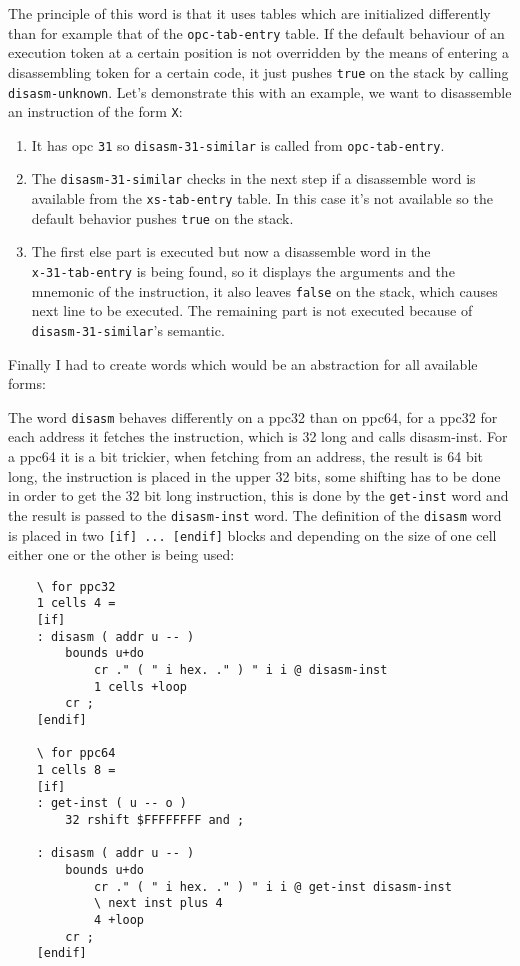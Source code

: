     The principle of this word is that it uses tables which are initialized
    differently than for example that of the \texttt{opc-tab-entry} table. If
    the default behaviour of an execution token at a certain position is not
    overridden by the means of entering a disassembling token for a certain
    code, it just pushes \texttt{true} on the stack by calling 
    \texttt{disasm-unknown}. Let's demonstrate this with an example, we want 
    to disassemble an instruction of the form \texttt{X}:

    \begin{enumerate}
    \item It has opc \texttt{31} so \texttt{disasm-31-similar} is called from
    \texttt{opc-tab-entry}.
    \item The \texttt{disasm-31-similar} checks in the next step if a
    disassemble word is available from the \texttt{xs-tab-entry} table. In 
    this case it's not available so the default behavior pushes 
    \texttt{true} on the stack.
    \item The first else part is executed but now a disassemble word in the 
    \\\texttt{x-31-tab-entry} is being found, so it displays the arguments and 
    the mnemonic of the instruction, it also leaves \texttt{false} on the stack,
    which causes next line to be executed. The remaining part is not executed
    because of \texttt{disasm-31-similar}'s semantic.
    \end{enumerate}

    Finally I had to create words which would be an abstraction for all 
    available forms:

    The word
    \texttt{disasm} behaves differently on a ppc32 than on ppc64, for a ppc32
    for each address it fetches the instruction, which is 32 long and calls
    disasm-inst. For a ppc64 it is a bit trickier, when fetching from an 
    address, the result is 64 bit long, the instruction is placed in the upper 
    32 bits, some shifting has to be done in order to get the 32 bit long
    instruction, this is done by the \texttt{get-inst} word and the result is
    passed to the \texttt{disasm-inst} word.
    The definition of the \texttt{disasm} word is placed in two
    \texttt{[if] ...  [endif]} blocks and depending on the size of one cell
    either one or the other is being used:

    \pagebreak
    \begin{verbatim}
    \ for ppc32
    1 cells 4 =
    [if]
    : disasm ( addr u -- )
        bounds u+do
            cr ." ( " i hex. ." ) " i i @ disasm-inst
            1 cells +loop
        cr ;
    [endif]

    \ for ppc64
    1 cells 8 =
    [if]
    : get-inst ( u -- o )
        32 rshift $FFFFFFFF and ;

    : disasm ( addr u -- )
        bounds u+do
            cr ." ( " i hex. ." ) " i i @ get-inst disasm-inst
            \ next inst plus 4
            4 +loop
        cr ;
    [endif]
    \end{verbatim}

